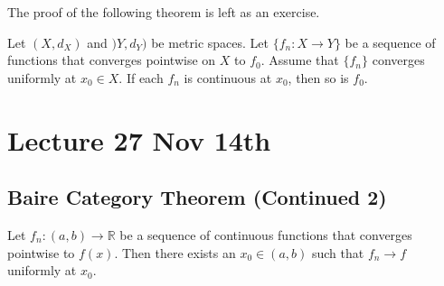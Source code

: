 \documentclass[notoc,notitlepage]{tufte-book}
\begin{document}
The proof of the following theorem is left as an exercise.

\begin{thm}\label{thm:limit_of_sequence_of_continuous_functions_that_converges_pointwise_is_continuous}
  Let $(X, d_X)$ and $)Y, d_Y)$ be metric spaces. Let $\{ f_n : X \to Y \}$ be a sequence of functions that converges pointwise on $X$ to $f_0$. Assume that $\{ f_n \}$ converges uniformly at $x_0 \in X$. If each $f_n$ is continuous at $x_0$, then so is $f_0$.
\end{thm}



\chapter{Lecture 27 Nov 14th}%
\label{chp:lecture_27_nov_14th}

\section{Baire Category Theorem (Continued 2)}%
\label{sec:baire_category_theorem_continued_2}

\begin{thm}\label{thm:uniform_convergence_of_a_sequence_of_continuous_functions_that_converges_pointwise}
  Let $f_n : (a, b) \to \mathbb{R}$ be a sequence of continuous functions that converges pointwise to $f(x)$. Then there exists an $x_0 \in (a, b)$ such that $f_n \to f$ uniformly at $x_0$.
\end{thm}
\end{document}
